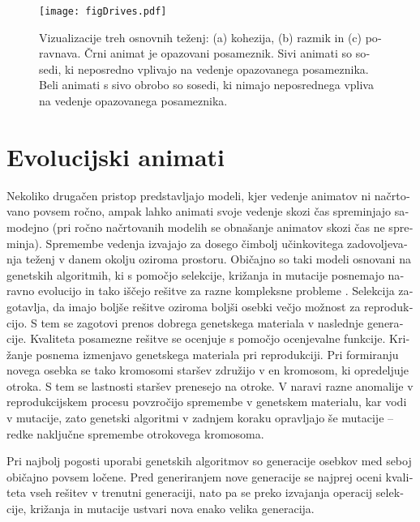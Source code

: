 \begin{slovenian}
\begin{figure*}
	\texttt{[image: figDrives.pdf]}
	\caption{Vizualizacije treh osnovnih teženj: (a) kohezija, (b) razmik in (c) poravnava. Črni animat je opazovani posameznik. Sivi animati so sosedi, ki neposredno vplivajo na vedenje opazovanega posameznika. Beli animati s sivo obrobo so sosedi, ki nimajo neposrednega vpliva na vedenje opazovanega posameznika.}
	\label{fig:drives_si}
\end{figure*}

\section{Evolucijski animati}

Nekoliko drugačen pristop predstavljajo modeli, kjer vedenje animatov ni načrtovano povsem ročno, ampak lahko animati svoje vedenje skozi čas spreminjajo samodejno (pri ročno načrtovanih modelih se obnašanje animatov skozi čas ne spreminja). Spremembe vedenja izvajajo za dosego čimbolj učinkovitega zadovoljevanja teženj v danem okolju oziroma prostoru. Običajno so taki modeli osnovani na genetskih algoritmih, ki s pomočjo selekcije, križanja in mutacije posnemajo naravno evolucijo in tako iščejo rešitve za razne kompleksne probleme \cite{goldberg1989genetic,goldberg2002design,holland1992adaptation}. Selekcija zagotavlja, da imajo boljše rešitve oziroma boljši osebki večjo možnost za reprodukcijo. S tem se zagotovi prenos dobrega genetskega materiala v naslednje generacije. Kvaliteta posamezne rešitve se ocenjuje s pomočjo ocenjevalne funkcije. Križanje posnema izmenjavo genetskega materiala pri reprodukciji. Pri formiranju novega osebka se tako kromosomi staršev združijo v en kromosom, ki opredeljuje otroka. S tem se lastnosti staršev prenesejo na otroke. V naravi razne anomalije v reprodukcijskem procesu povzročijo spremembe v genetskem materialu, kar vodi v mutacije, zato genetski algoritmi v zadnjem koraku opravljajo še mutacije -- redke naključne spremembe otrokovega kromosoma. 

Pri najbolj pogosti uporabi genetskih algoritmov so generacije osebkov med seboj običajno povsem ločene. Pred generiranjem nove generacije se najprej oceni kvaliteta vseh rešitev v trenutni generaciji, nato pa se preko izvajanja operacij selekcije, križanja in mutacije ustvari nova enako velika generacija.


\end{slovenian}
